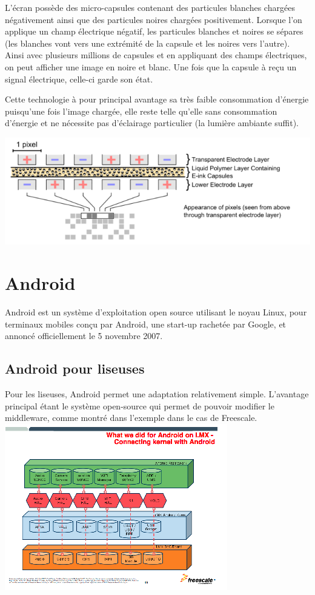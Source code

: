 L'écran possède des micro-capsules contenant des particules blanches chargées négativement ainsi que des particules noires chargées positivement. Lorsque l'on applique un champ électrique négatif, les particules blanches et noires se sépares (les blanches vont vers une extrémité de la capsule et les noires vers l'autre). Ainsi avec plusieurs millions de capsules et en appliquant des champs électriques, on peut afficher une image en noire et blanc. Une fois que la capsule à reçu un signal électrique, celle-ci garde son état.

Cette technologie à pour principal avantage sa très faible consommation d'énergie puisqu'une fois l'image chargée, elle reste telle qu'elle sans consommation d'énergie et ne nécessite pas d'éclairage particulier (la lumière ambiante suffit).

\begin{center}
	\includegraphics{Electrophoretic.png}
\end{center}


\section{Android}
Android est un système d'exploitation open source utilisant le noyau Linux, pour terminaux mobiles conçu par Android, une start-up rachetée par Google, et annoncé officiellement le 5 novembre 2007.

\subsection{Android pour liseuses}
Pour les liseuses, Android permet une adaptation relativement simple. L'avantage principal étant le système open-source qui permet de pouvoir modifier le middleware, comme montré dans l'exemple dans le cas de Freescale.\\
\includegraphics{pileAndroidLiseuse.png}

